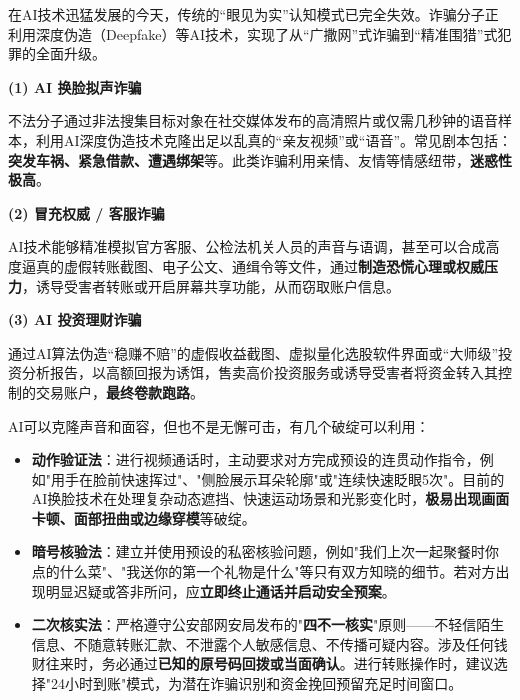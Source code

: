 
在AI技术迅猛发展的今天，传统的“眼见为实”认知模式已完全失效。诈骗分子正利用深度伪造（Deepfake）等AI技术，实现了从“广撒网”式诈骗到“精准围猎”式犯罪的全面升级。


\textbf{(1) AI 换脸拟声诈骗}\par

不法分子通过非法搜集目标对象在社交媒体发布的高清照片或仅需几秒钟的语音样本，利用AI深度伪造技术克隆出足以乱真的“亲友视频”或“语音”。常见剧本包括：\textbf{突发车祸、紧急借款、遭遇绑架}等。此类诈骗利用亲情、友情等情感纽带，\textbf{迷惑性极高}。

\textbf{(2) 冒充权威 / 客服诈骗}\par

AI技术能够精准模拟官方客服、公检法机关人员的声音与语调，甚至可以合成高度逼真的虚假转账截图、电子公文、通缉令等文件，通过\textbf{制造恐慌心理或权威压力}，诱导受害者转账或开启屏幕共享功能，从而窃取账户信息。

\textbf{(3) AI 投资理财诈骗}\par

通过AI算法伪造“稳赚不赔”的虚假收益截图、虚拟量化选股软件界面或“大师级”投资分析报告，以高额回报为诱饵，售卖高价投资服务或诱导受害者将资金转入其控制的交易账户，\textbf{最终卷款跑路}。


AI可以克隆声音和面容，但也不是无懈可击，有几个破绽可以利用：

\begin{itemize}
  \item \textbf{动作验证法}：进行视频通话时，主动要求对方完成预设的连贯动作指令，例如"用手在脸前快速挥过"、"侧脸展示耳朵轮廓"或"连续快速眨眼5次"。目前的AI换脸技术在处理复杂动态遮挡、快速运动场景和光影变化时，\textbf{极易出现画面卡顿、面部扭曲或边缘穿模}等破绽。
  \item \textbf{暗号核验法}：建立并使用预设的私密核验问题，例如"我们上次一起聚餐时你点的什么菜"、"我送你的第一个礼物是什么"等只有双方知晓的细节。若对方出现明显迟疑或答非所问，应\textbf{立即终止通话并启动安全预案}。
  \item \textbf{二次核实法}：严格遵守公安部网安局发布的"\textbf{四不一核实}"原则——不轻信陌生信息、不随意转账汇款、不泄露个人敏感信息、不传播可疑内容。涉及任何钱财往来时，务必通过\textbf{已知的原号码回拨或当面确认}。进行转账操作时，建议选择"24小时到账"模式，为潜在诈骗识别和资金挽回预留充足时间窗口。
\end{itemize}

